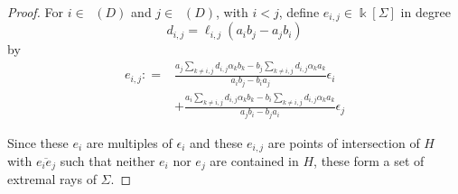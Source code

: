 \documentclass{amsart}
\theoremstyle{plain}
\theoremstyle{definition}
\theoremstyle{remark}
\newtheorem{rem}[thm]{Remark}
\numberwithin{equation}{section}
\newcommand\bk{{\Bbbk}}
\newcommand\bida{a}
\newcommand\bidb{b}
\DeclareMathOperator{\Tp}{T_+}
\DeclareMathOperator{\Tm}{T_-}
\begin{document}
\begin{proof}
\noindent
For $i \in \Tp(D)$ and $j \in \Tm(D)$, with $i < j$, define $e_{i,j}\in \bk[\Sigma]$ in degree 
\[
	d_{i,j} = \ell_{i, j}(\bida_i \bidb_j - \bida_j \bidb_i)
\]
by
\begin{align}\label{eqn:epsilon_i,j}
e_{i,j} \colon = &\frac{a_j\sum_{k\ne i,j} d_{i,j}\alpha_k b_k - b_j\sum_{k \ne i,j} d_{i,j} \alpha_k a_k}{a_ib_j - b_i a_j} \epsilon_i \\
&+ \frac{a_i \sum_{k\ne i,j} d_{i,j} \alpha_k b_k - b_i\sum_{k\ne i,j} d_{i,j} \alpha_ka_k}{a_jb_i - b_j a_i} \epsilon_j
%	
\end{align}

%

Since these $e_i$ are multiples of $\epsilon_i$ and these
$e_{i,j}$ are points of intersection of $H$ with
$\overline {e_ie_j}$ such that neither $e_i$ nor $e_j$
are contained in $H$, these form a set of extremal rays of $\Sigma$.



\end{proof}
\end{document}
